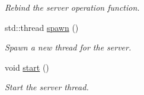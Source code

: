\begin{DoxyCompactItemize}
\begin{DoxyCompactList}\small\item\em Rebind the server operation function. \end{DoxyCompactList}\item 
std\+::thread \hyperlink{classzcm_1_1Server_a77c0b86016dce3e6cef6a64118edd584}{spawn} ()
\begin{DoxyCompactList}\small\item\em Spawn a new thread for the server. \end{DoxyCompactList}\item 
void \hyperlink{classzcm_1_1Server_ab94400c32a097989a769cfb1d77936b4}{start} ()
\begin{DoxyCompactList}\small\item\em Start the server thread. \end{DoxyCompactList}\end{DoxyCompactItemize}
